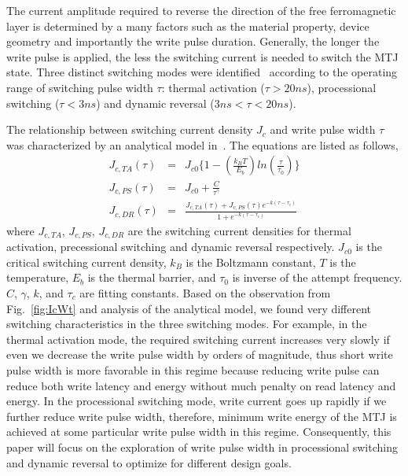 The current amplitude required to reverse the direction of the free ferromagnetic layer is determined by a many factors such as the material property, device geometry and importantly the write pulse duration. Generally, the longer the write pulse is applied, the less the switching current is needed to switch the MTJ state. Three distinct switching modes were identified~\cite{STTRAM:JAP07} according to the operating range of switching pulse width $\tau$: thermal activation ($\tau>20ns$), processional switching ($\tau<3ns$) and dynamic reversal ($3ns<\tau<20ns$).

The relationship between switching current density $J_{c}$ and write pulse width $\tau$ was characterized by an analytical model in~\cite{STTRAM:IEDM09}. The equations are listed as follows,
\begin{eqnarray}
J_{c,TA}(\tau) &=& J_{c0}\{1- (\frac{k_{B}T}{E_{b}})ln(\frac{\tau}{\tau_{0}})\} \label{eqn:jcta} \\
J_{c,PS}(\tau) &=& J_{c0}+ \frac{C}{\tau^{\gamma}} \label{eqn:jcps} \\
J_{c,DR}(\tau) &=& \frac{J_{c,TA}(\tau)+J_{c,PS}(\tau)e^{-k(\tau - \tau_{c})}}{1+e^{-k(\tau - \tau_{c})}} \label{eqn:jcdr}
\end{eqnarray}
where $J_{c,TA}$, $J_{c,PS}$, $J_{c,DR}$ are the switching current densities for thermal activation, precessional switching and dynamic reversal respectively. $J_{c0}$ is the critical switching current density, $k_{B}$ is the Boltzmann constant, $T$ is the temperature, $E_{b}$ is the thermal barrier, and $\tau_{0}$ is inverse of the attempt frequency. $C$, $\gamma$, $k$, and $\tau_{c}$ are fitting constants. Based on the observation from Fig.~\ref{fig:IcWt} and analysis of the analytical model,  we found very different switching characteristics in the three switching modes. For example, in the thermal activation mode, the required switching current increases very slowly if even we decrease the write pulse width by orders of magnitude, thus short write pulse width is more favorable in this regime because reducing write pulse can reduce both write latency and energy without much penalty on read latency and energy. In the processional switching mode, write current goes up rapidly if we further reduce write pulse width, therefore, minimum write energy of the MTJ is achieved at some particular write pulse width in this regime. Consequently, this paper will focus on the exploration of write pulse width in processional switching and dynamic reversal to optimize for different design goals.

